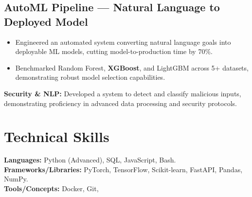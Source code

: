 \documentclass[10pt, a4paper]{article}
\begin{document}
\subsection*{AutoML Pipeline — Natural Language to Deployed Model}
\begin{itemize}[leftmargin=*, itemsep=1pt]
    \item Engineered an automated system converting natural language goals into deployable ML models, cutting model-to-production time by 70\%.
    \item Benchmarked Random Forest, \textbf{XGBoost}, and LightGBM across 5+ datasets, demonstrating robust model selection capabilities.
\end{itemize}

\vspace{0.5em}
\noindent\textbf{Security & NLP:} Developed a system to detect and classify malicious inputs, demonstrating proficiency in advanced data processing and security protocols.

\section{Technical Skills}
\noindent\textbf{Languages:} Python (Advanced), SQL, JavaScript, Bash. \\
\noindent\textbf{Frameworks/Libraries:} PyTorch, TensorFlow, Scikit-learn, FastAPI, Pandas, NumPy. \\
\noindent\textbf{Tools/Concepts:} Docker, Git,
\end{document}
